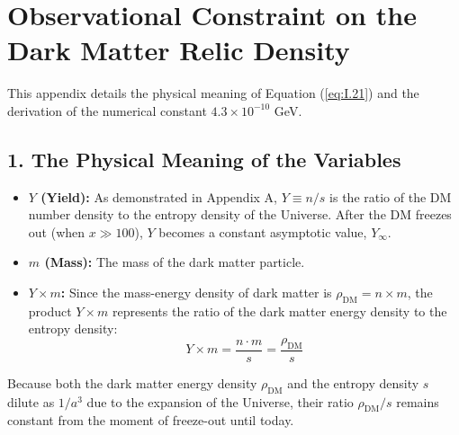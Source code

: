 \documentclass[11pt,a4paper]{article}
\begin{document}
\section{Observational Constraint on the Dark Matter Relic Density}
\label{sec:today}

This appendix details the physical meaning of Equation (\ref{eq:I.21}) and the derivation of the numerical constant $4.3 \times 10^{-10}$ GeV.

\subsection*{1. The Physical Meaning of the Variables}
\begin{itemize}
    \item \textbf{$Y$ (Yield):} As demonstrated in Appendix A, $Y \equiv n/s$ is the ratio of the DM number density to the entropy density of the Universe. After the DM freezes out (when $x \gg 100$), $Y$ becomes a constant asymptotic value, $Y_\infty$.
    \item \textbf{$m$ (Mass):} The mass of the dark matter particle.
    \item \textbf{$Y \times m$:} Since the mass-energy density of dark matter is $\rho_{\text{DM}} = n \times m$, the product $Y \times m$ represents the ratio of the dark matter energy density to the entropy density:
    \begin{equation}
        Y \times m = \frac{n \cdot m}{s} = \frac{\rho_{\text{DM}}}{s}
    \end{equation}
\end{itemize}
Because both the dark matter energy density $\rho_{\text{DM}}$ and the entropy density $s$ dilute as $1/a^3$ due to the expansion of the Universe, their ratio $\rho_{\text{DM}}/s$ remains constant from the moment of freeze-out until today.
\end{document}
